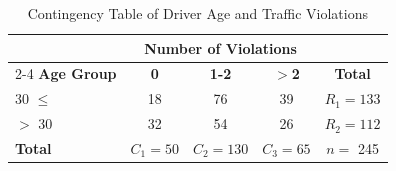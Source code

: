 \begin{table}[H]
\centering
\caption{Contingency Table of Driver Age and Traffic Violations}
\label{tab:table1}
\begin{tabular}{@{}l|ccc|c@{}}
\toprule
 & \multicolumn{3}{c|}{\textbf{Number of Violations}} & \\
\cmidrule{2-4}
\textbf{Age Group} & \textbf{0} & \textbf{1-2} & \textbf{$>$2} & \textbf{Total} \\ 
\midrule
30 $\le$ & 18 & 76 & 39 & $R_{1}=133$\\
$>$ 30 & 32 & 54 & 26 & $R_{2}=112$\\
\midrule
\textbf{Total} & $C_{1} = 50$ & $C_{2}=130$ & $C_{3}=65$ & $n =$ 245 \\ 
\bottomrule
\end{tabular}
\end{table}